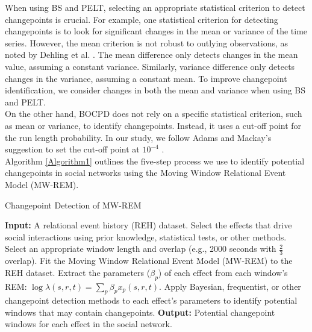 \documentclass[]{interact}
\theoremstyle{plain}%
\theoremstyle{definition}
\theoremstyle{remark}
\begin{document}
	When using BS and PELT, selecting an appropriate statistical criterion to detect changepoints is crucial. For example, one statistical criterion for detecting changepoints is to look for significant changes in the mean or variance of the time series. However, the mean criterion is not robust to outlying observations, as noted by Dehling et al. \cite{dehlingRobustMethodShift2020}. The mean difference only detects changes in the mean value, assuming a constant variance. Similarly, variance difference only detects changes in the variance, assuming a constant mean. To improve changepoint identification, we consider changes in both the mean and variance when using BS and PELT. \\
	
	On the other hand, BOCPD does not rely on a specific statistical criterion, such as mean or variance, to identify changepoints. Instead, it uses a cut-off point for the run length probability. In our study, we follow Adams and Mackay's suggestion to set the cut-off point at $10^{-4}$ \cite{adamsBayesianOnlineChangepoint2007}. \\
	
	Algorithm \ref{Algorithm1} outlines the five-step process we use to identify potential changepoints in social networks using the Moving Window Relational Event Model (MW-REM).
	
	\begin{scriptsize}
	\begin{algorithm}[H]
		\caption{Changepoint Detection of MW-REM}\label{Algorithm1}
		\small %
		\begin{algorithmic}[1]
			\Statex \textbf{Input:} A relational event history (REH) dataset.
			\State Select the effects that drive social interactions using prior knowledge, statistical tests, or other methods.
			\State Select an appropriate window length and overlap (e.g., 2000 seconds with $\frac{2}{3}$ overlap).
			\State Fit the Moving Window Relational Event Model (MW-REM) to the REH dataset.
			\State Extract the parameters ($\beta_p$) of each effect from each window's REM: $\log \lambda(s,r,t) = \sum_{p} \beta_p x_p(s,r,t)$.
			\State Apply Bayesian, frequentist, or other changepoint detection methods to each effect's parameters to identify potential windows that may contain changepoints.
			\Statex \textbf{Output:} Potential changepoint windows for each effect in the social network.
		\end{algorithmic}
	\end{algorithm}
    \end{scriptsize}
\end{document}
